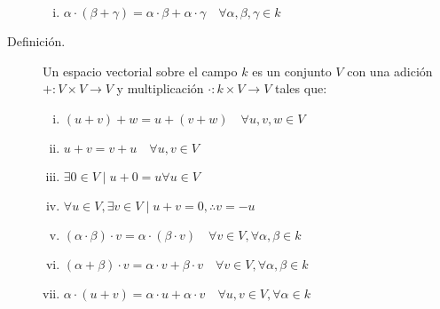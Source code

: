 \documentclass[12pt]{article}
\begin{document}
\begin{description}
\begin{enumerate}[i)]
\item
\begin{math}
	\alpha \cdot (\beta + \gamma) = \alpha \cdot \beta + \alpha \cdot \gamma \quad \forall \alpha, \beta, \gamma \in k
\end{math}

\end{enumerate}

\item [Definición.] Un espacio vectorial sobre el campo $k$ es un conjunto $V$ con una adición $+: V \times V \to V$ y multiplicación $\cdot: k \times V \to V$ tales que:

\begin{enumerate}[i)]

\item
\begin{math}
	(u + v) + w = u + (v + w) \quad \forall u, v, w \in V
\end{math}

\item
\begin{math}
	u + v = v + u \quad \forall u, v \in V
\end{math}

\item
\begin{math}
\exists 0 \in V \mid u + 0 = u \forall u \in V
\end{math}

\item
\begin{math}
	\forall u \in V, \exists v \in V \mid u + v = 0, \therefore v = -u
\end{math}

\item
\begin{math}
	(\alpha \cdot \beta) \cdot v = \alpha \cdot (\beta \cdot v) \quad \forall v \in V, \forall \alpha, \beta \in k
\end{math}

\item
\begin{math}
	(\alpha + \beta) \cdot v = \alpha \cdot v + \beta \cdot v \quad \forall v \in V, \forall \alpha, \beta \in k
\end{math}

\item
\begin{math}
	\alpha \cdot (u + v) = \alpha \cdot u + \alpha \cdot v \quad \forall u, v \in V, \forall \alpha \in k
\end{math}


\end{enumerate}
\end{description}
\end{document}
